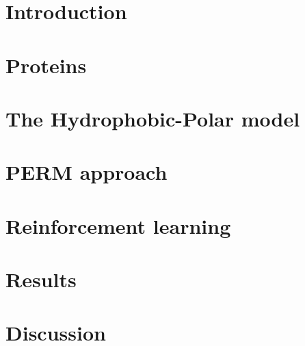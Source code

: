 \documentclass[12pt,a4paper]{article}
\title{}
\author{Gregorio Berselli, Isacco Faglioni}
\date{\today}
\begin{document}
\maketitle
\begin{center}
	\url{}
\end{center}

\begin{abstract}
\end{abstract}
\thispagestyle{empty}

\newpage
\thispagestyle{empty}
\addtocounter{page}{-2}
\mbox{}

\tableofcontents
\pagebreak

\section*{Introduction}

\pagebreak

\section{Proteins}

\pagebreak

\section{The Hydrophobic-Polar model}

\pagebreak

\section{PERM approach}

\pagebreak

\section{Reinforcement learning}

\pagebreak

\section{Results}

\pagebreak

\section{Discussion}

\pagebreak

\newpage
\thispagestyle{empty}
\mbox{}

\printbibliography
\end{document}
